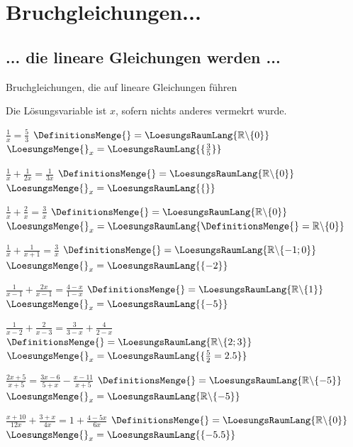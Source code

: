 \newpage
\section{Bruchgleichungen...}
\subsection{... die lineare Gleichungen werden ...}

Bruchgleichungen, die auf lineare Gleichungen führen

Die Lösungsvariable ist $x$, sofern nichts anderes vermekrt wurde.


\begin{bbwAufgabenBlock}
\item $\frac1x = \frac53$     \hspace{10mm}              $\DefinitionsMenge{}= \LoesungsRaumLang{\mathbb{R}\backslash\{0\}}$    $\LoesungsMenge{}_x = \LoesungsRaumLang{\{\frac35\}}$
\item $\frac1x + \frac1{2x} = \frac1{3x}$ \hspace{10mm}   $\DefinitionsMenge{}= \LoesungsRaumLang{\mathbb{R}\backslash\{0\}}$    $\LoesungsMenge{}_x = \LoesungsRaumLang{\{\}}$\noTRAINER{\newpage}
\item $\frac1x + \frac2x = \frac3x$  \hspace{10mm}       $\DefinitionsMenge{}= \LoesungsRaumLang{\mathbb{R}\backslash\{0\}}$    $\LoesungsMenge{}_x = \LoesungsRaumLang{\DefinitionsMenge{}=\mathbb{R}\backslash\{0\}}$
\item $\frac1x + \frac1{x+1} = \frac3x$ \hspace{10mm}    $\DefinitionsMenge{}= \LoesungsRaumLang{\mathbb{R}\backslash\{-1;0\}}$ $\LoesungsMenge{}_x = \LoesungsRaumLang{\{-2\}}$
\item $\frac1{x-1} + \frac{2x}{x-1} = \frac{4-x}{1-x}$ \hspace{10mm}    $\DefinitionsMenge{}= \LoesungsRaumLang{\mathbb{R}\backslash\{1\}}$ $\LoesungsMenge{}_x = \LoesungsRaumLang{\{-5\}}$\noTRAINER{\newpage}
\item $\frac1{x-2} + \frac{2}{x-3} = \frac3{3-x} + \frac{4}{2-x}$ \hspace{10mm}    $\DefinitionsMenge{}= \LoesungsRaumLang{\mathbb{R}\backslash\{2;3\}}$ $\LoesungsMenge{}_x = \LoesungsRaumLang{\{\frac{5}{2}=2.5\}}$
\item $\frac{2x+5}{x+5} = \frac{3x-6}{5+x} - \frac{x-11}{x+5}$ \hspace{10mm}    $\DefinitionsMenge{}= \LoesungsRaumLang{\mathbb{R} \backslash \{-5\}}$ $\LoesungsMenge{}_x = \LoesungsRaumLang{\mathbb{R}\backslash \{-5\}}$
\item $\frac{x+10}{12x} + \frac{3+x}{4x} = 1 + \frac{4-5x}{6x}$ \hspace{10mm}    $\DefinitionsMenge{}= \LoesungsRaumLang{\mathbb{R}\backslash\{0\}}$ $\LoesungsMenge{}_x = \LoesungsRaumLang{\{-5.5\}}$
\end{bbwAufgabenBlock}

